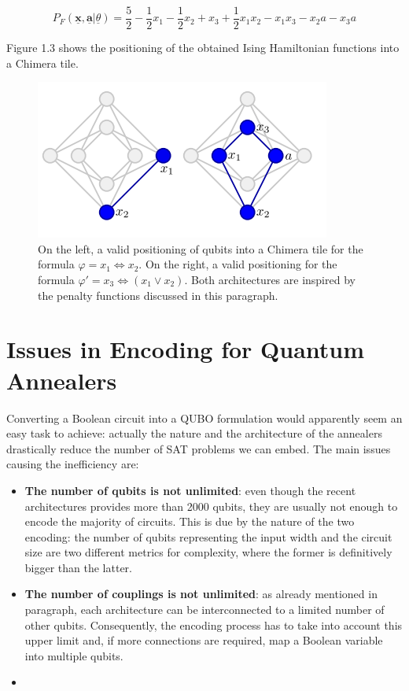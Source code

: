 \begin{equation}
    P_F(\underline{\textbf{x}},\underline{\textbf{a}} | \underline{\theta}) = \frac{5}{2} - \frac{1}{2} x_1 - \frac{1}{2} x_2 + x_3 + \frac{1}{2} x_1x_2 - x_1x_3 - x_2a -x_3a
\end{equation}

Figure 1.3 shows the positioning of the obtained Ising Hamiltonian functions into a Chimera tile.
\begin{figure}[t]
	\begin{center}
	\includegraphics{Ising1+2.png}
	\caption{On the left, a valid positioning of qubits into a Chimera tile for the formula $\varphi = x_1 \iff x_2$. On the right, a valid positioning for the formula $\varphi ' = x_3 \iff (x_1 \vee x_2)$. Both architectures are inspired by the penalty functions discussed in this paragraph.}
	\end{center}
\end{figure}

\section{Issues in Encoding for Quantum Annealers}

Converting a Boolean circuit into a QUBO formulation would apparently seem an easy task to achieve: actually the nature and the architecture of the annealers drastically reduce the number of SAT problems we can embed. The main issues causing the inefficiency are:

\begin{itemize}
    \item \textbf{The number of qubits is not unlimited}: even though the recent architectures provides more than 2000 qubits, they are usually not enough to encode the majority of circuits.
    This is due by the nature of the two encoding: the number of qubits representing the input width and the circuit size are two different metrics for complexity, where the former is definitively bigger than the latter. 
    \item \textbf{The number of couplings is not unlimited}: as already mentioned in paragraph, each architecture can be interconnected to a limited number of other qubits. Consequently, the encoding process has to take into account this upper limit and, if more connections are required, map a Boolean variable into multiple qubits.
    \item 
\end{itemize}

